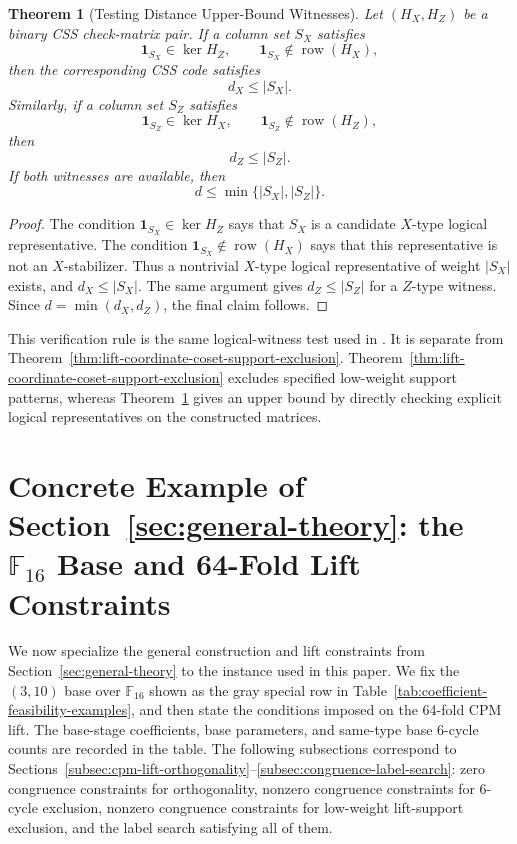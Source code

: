 \documentclass[11pt,a4paper]{article}
\newcommand{\F}{\mathbb{F}}
\newcommand{\vect}[1]{\bm{#1}}
\newcommand{\row}{\operatorname{row}}
\newcommand{\kerop}{\operatorname{ker}}
\theoremstyle{uprighttheorem}
\newtheorem{theorem}{Theorem}
\begin{document}
\begin{theorem}[Testing Distance Upper-Bound Witnesses]\label{thm:distance-upper-bound-witness}
Let \((H_X,H_Z)\) be a binary CSS check-matrix pair.
If a column set \(S_X\) satisfies
\[
  \vect{1}_{S_X}\in\kerop H_Z,
  \qquad
  \vect{1}_{S_X}\notin \row(H_X),
\]
then the corresponding CSS code satisfies
\[
  d_X\le |S_X|.
\]
Similarly, if a column set \(S_Z\) satisfies
\[
  \vect{1}_{S_Z}\in\kerop H_X,
  \qquad
  \vect{1}_{S_Z}\notin \row(H_Z),
\]
then
\[
  d_Z\le |S_Z|.
\]
If both witnesses are available, then
\[
  d\le \min\{|S_X|,|S_Z|\}.
\]
\end{theorem}

\begin{proof}
The condition \(\vect{1}_{S_X}\in\kerop H_Z\) says that \(S_X\) is a candidate \(X\)-type logical representative.
The condition \(\vect{1}_{S_X}\notin \row(H_X)\) says that this representative is not an \(X\)-stabilizer.
Thus a nontrivial \(X\)-type logical representative of weight \(|S_X|\) exists, and \(d_X\le |S_X|\).
The same argument gives \(d_Z\le |S_Z|\) for a \(Z\)-type witness.
Since \(d=\min(d_X,d_Z)\), the final claim follows.
\end{proof}

This verification rule is the same logical-witness test used in \cite{kasai2026heuristic}.
It is separate from Theorem~\ref{thm:lift-coordinate-coset-support-exclusion}.
Theorem~\ref{thm:lift-coordinate-coset-support-exclusion} excludes specified low-weight support patterns, whereas Theorem~\ref{thm:distance-upper-bound-witness} gives an upper bound by directly checking explicit logical representatives on the constructed matrices.

\section{Concrete Example of Section~\ref{sec:general-theory}: the \texorpdfstring{$\F_{16}$}{F16} Base and 64-Fold Lift Constraints}\label{sec:f16-instance}\label{sec:lift-constraints}
We now specialize the general construction and lift constraints from Section~\ref{sec:general-theory} to the instance used in this paper.
We fix the \((3,10)\) base over \(\F_{16}\) shown as the gray special row in Table~\ref{tab:coefficient-feasibility-examples}, and then state the conditions imposed on the 64-fold CPM lift.
The base-stage coefficients, base parameters, and same-type base 6-cycle counts are recorded in the table.
The following subsections correspond to Sections~\ref{subsec:cpm-lift-orthogonality}--\ref{subsec:congruence-label-search}: zero congruence constraints for orthogonality, nonzero congruence constraints for 6-cycle exclusion, nonzero congruence constraints for low-weight lift-support exclusion, and the label search satisfying all of them.
\end{document}
